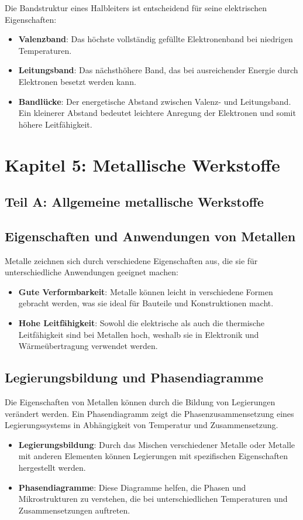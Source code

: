 \documentclass[a4paper,12pt]{article}
\begin{document}
Die Bandstruktur eines Halbleiters ist entscheidend für seine elektrischen Eigenschaften:
\begin{itemize}
    \item \textbf{Valenzband}: Das höchste vollständig gefüllte Elektronenband bei niedrigen Temperaturen.
    \item \textbf{Leitungsband}: Das nächsthöhere Band, das bei ausreichender Energie durch Elektronen besetzt werden kann.
    \item \textbf{Bandlücke}: Der energetische Abstand zwischen Valenz- und Leitungsband. Ein kleinerer Abstand bedeutet leichtere Anregung der Elektronen und somit höhere Leitfähigkeit.
\end{itemize}

\newpage

\section{Kapitel 5: Metallische Werkstoffe}

\subsection{Teil A: Allgemeine metallische Werkstoffe}
\subsection{Eigenschaften und Anwendungen von Metallen}

Metalle zeichnen sich durch verschiedene Eigenschaften aus, die sie für unterschiedliche Anwendungen geeignet machen:
\begin{itemize}
    \item \textbf{Gute Verformbarkeit}: Metalle können leicht in verschiedene Formen gebracht werden, was sie ideal für Bauteile und Konstruktionen macht.
    \item \textbf{Hohe Leitfähigkeit}: Sowohl die elektrische als auch die thermische Leitfähigkeit sind bei Metallen hoch, weshalb sie in Elektronik und Wärmeübertragung verwendet werden.
\end{itemize}

\subsection{Legierungsbildung und Phasendiagramme}

Die Eigenschaften von Metallen können durch die Bildung von Legierungen verändert werden. Ein Phasendiagramm zeigt die Phasenzusammensetzung eines Legierungssystems in Abhängigkeit von Temperatur und Zusammensetzung.
\begin{itemize}
    \item \textbf{Legierungsbildung}: Durch das Mischen verschiedener Metalle oder Metalle mit anderen Elementen können Legierungen mit spezifischen Eigenschaften hergestellt werden.
    \item \textbf{Phasendiagramme}: Diese Diagramme helfen, die Phasen und Mikrostrukturen zu verstehen, die bei unterschiedlichen Temperaturen und Zusammensetzungen auftreten.
\end{itemize}
\end{document}
